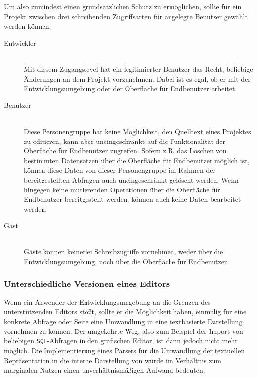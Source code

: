 Um also zumindest einen grundsätzlichen Schutz zu ermöglichen, sollte für ein Projekt zwischen drei schreibenden Zugriffsarten für angelegte Benutzer gewählt werden können:


\begin{description}
  \item[Entwickler] \hfill \\
    Mit diesem Zugangslevel hat ein legitimierter Benutzer das Recht, beliebige Änderungen an dem Projekt vorzunehmen. Dabei ist es egal, ob er mit der Entwicklungsumgebung oder der Oberfläche für Endbenutzer arbeitet.
  \item[Benutzer] \hfill \\
    Diese Personengruppe hat keine Möglichkeit, den Quelltext eines Projektes zu editieren, kann aber uneingeschränkt auf die Funktionalität der Oberfläche für Endbenutzer zugreifen. Sofern z.B. das Löschen von bestimmten Datensätzen über die Oberfläche für Endbenutzer möglich ist, können diese Daten von dieser Personengruppe im Rahmen der bereitgestellten Abfragen auch uneingeschränkt gelöscht werden. Wenn hingegen keine mutierenden Operationen über die Oberfläche für Endbenutzer bereitgestellt werden, können auch keine Daten bearbeitet werden.
  \item[Gast] \hfill \\
    Gäste können keinerlei Schreibzugriffe vornehmen, weder über die Entwicklungsumgebung, noch über die Oberfläche für Endbenutzer.
\end{description}

\subsubsection{Unterschiedliche Versionen eines Editors}
\label{sec:editor-different-versions}

Wenn ein Anwender der Entwicklungsumgebung an die Grenzen des unterstützenden Editors stößt, sollte er die Möglichkeit haben, einmalig für eine konkrete Abfrage oder Seite eine Umwandlung in eine textbasierte Darstellung vornehmen zu können. Der umgekehrte Weg, also zum Beispiel der Import von beliebigen \texttt{SQL}-Abfragen in den grafischen Editor, ist dann jedoch nicht mehr möglich. Die Implementierung eines Parsers für die Umwandlung der textuellen Repräsentation in die interne Darstellung von \idename{} würde im Verhältnis zum marginalen Nutzen einen unverhältnismäßigen Aufwand bedeuten.

